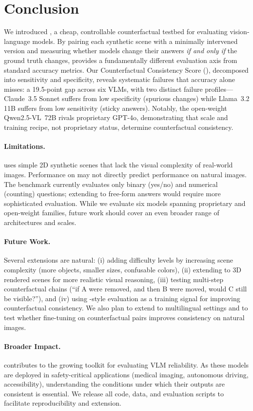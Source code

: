 \section{Conclusion}
\label{sec:conclusion}

We introduced \method, a cheap, controllable counterfactual testbed for evaluating vision-language models. By pairing each synthetic scene with a minimally intervened version and measuring whether models change their answers \emph{if and only if} the ground truth changes, \method provides a fundamentally different evaluation axis from standard accuracy metrics. Our Counterfactual Consistency Score (\ccs), decomposed into sensitivity and specificity, reveals systematic failures that accuracy alone misses: a 19.5-point \ccs gap across six VLMs, with two distinct failure profiles---Claude~3.5 Sonnet suffers from low specificity (spurious changes) while Llama~3.2 11B suffers from low sensitivity (sticky answers). Notably, the open-weight Qwen2.5-VL~72B rivals proprietary GPT-4o, demonstrating that scale and training recipe, not proprietary status, determine counterfactual consistency.

\paragraph{Limitations.}
\method uses simple 2D synthetic scenes that lack the visual complexity of real-world images. Performance on \method may not directly predict performance on natural images. The benchmark currently evaluates only binary (yes/no) and numerical (counting) questions; extending to free-form answers would require more sophisticated evaluation. While we evaluate six models spanning proprietary and open-weight families, future work should cover an even broader range of architectures and scales.

\paragraph{Future Work.}
Several extensions are natural: (i) adding difficulty levels by increasing scene complexity (more objects, smaller sizes, confusable colors), (ii) extending to 3D rendered scenes for more realistic visual reasoning, (iii) testing multi-step counterfactual chains (``if A were removed, and then B were moved, would C still be visible?''), and (iv) using \method-style evaluation as a training signal for improving counterfactual consistency. We also plan to extend \method to multilingual settings and to test whether fine-tuning on counterfactual pairs improves consistency on natural images.

\paragraph{Broader Impact.}
\method contributes to the growing toolkit for evaluating VLM reliability. As these models are deployed in safety-critical applications (medical imaging, autonomous driving, accessibility), understanding the conditions under which their outputs are consistent is essential. We release all code, data, and evaluation scripts to facilitate reproducibility and extension.
